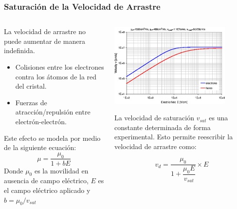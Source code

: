 \documentclass[10pt,t,aspectratio=169]{beamer}
\begin{document}
\begin{frame}[t]
    \frametitle{Saturación de la Velocidad de Arrastre}

    \begin{columns}
    
        \begin{column}{0.5\textwidth}
        
            La velocidad de arrastre no puede aumentar de manera indefinida. 
            
            \begin{itemize}
                \item Colisiones entre los electrones contra los átomos de la red del cristal.
                \item Fuerzas de atracción/repulsión entre electrón-electrón.
            \end{itemize}
            Este efecto se modela por medio de la siguiente ecuación:
            \[ \mu = \dfrac{\mu_0}{1+bE} \]
            Donde $\mu_0$ es la movilidad en ausencia de campo eléctrico, $E$ es el campo eléctrico aplicado y $b=\mu_0/v_{sat}$
            
        \end{column}
        
        \begin{column}{0.5\textwidth}
        
            \centering
            \includegraphics[width=6cm]{./figures/vdsat.png}

            \flushleft
            La velocidad de saturación $v_{sat}$ es una constante determinada de forma experimental. Esto permite reescribir la velocidad de arrastre como:

            \[ v_d = \dfrac{\mu_0}{1+\dfrac{\mu_0E}{v_{sat}}}\times{}E \]

        \end{column}
        
    \end{columns}
    
\end{frame}
\end{document}
